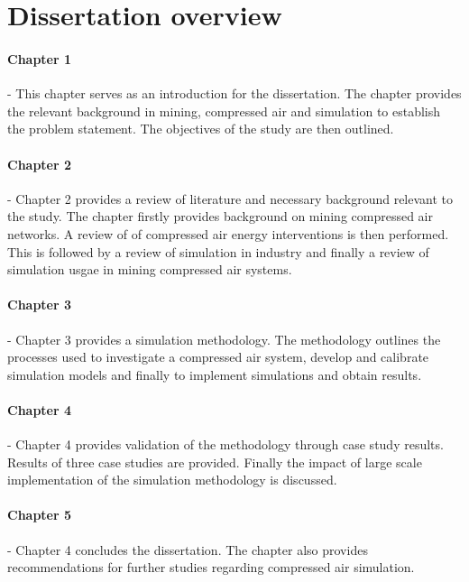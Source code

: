 \section{Dissertation overview}
	\paragraph{Chapter 1} \hspace{0.4cm} - \hspace{0.05cm} This chapter serves as an introduction for the dissertation. The chapter provides the relevant background in mining, compressed air and simulation to establish the problem statement. The objectives of the study are then outlined.
	\paragraph{Chapter 2} \hspace{0.4cm} - \hspace{0.05cm} Chapter 2 provides a review of literature and necessary background relevant to the study. The chapter firstly provides background on mining compressed air networks. A review of of compressed air energy interventions is then performed. This is followed by a review of simulation in industry and finally a review of simulation usgae in mining compressed air systems.
	\paragraph{Chapter 3} \hspace{0.4cm} - \hspace{0.05cm} Chapter 3 provides a simulation methodology. The methodology outlines the processes used to investigate a compressed air system, develop and calibrate simulation models and finally to implement simulations and obtain results.
	\paragraph{Chapter 4} \hspace{0.4cm} - \hspace{0.05cm} Chapter 4 provides validation of the methodology through case study results. Results of three case studies are provided. Finally the impact of large scale implementation of the simulation methodology is discussed.
	\paragraph{Chapter 5} \hspace{0.4cm} - \hspace{0.05cm} Chapter 4 concludes the dissertation. The chapter also provides recommendations for further studies regarding compressed air simulation.
